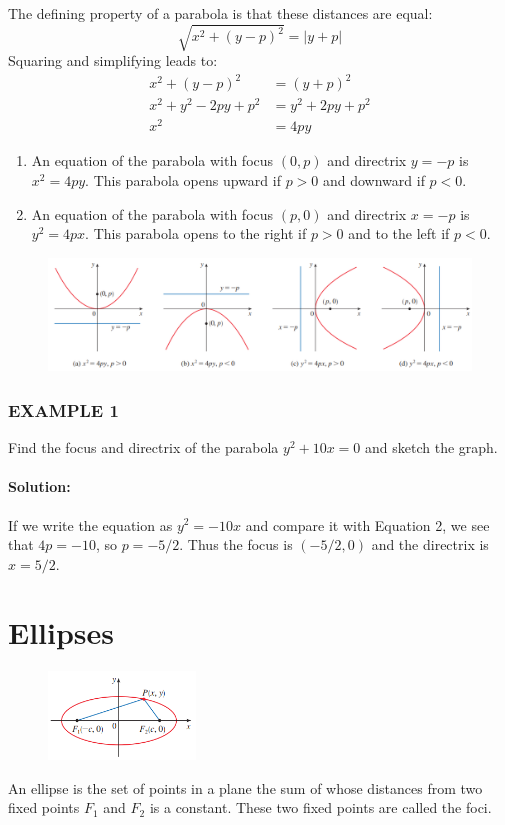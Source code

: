 \documentclass{article}
\begin{document}
The defining property of a parabola is that these distances are equal:
\[
\sqrt{x^2 + (y-p)^2} = |y+p|
\]
Squaring and simplifying leads to:
\begin{align*}
    x^2 + (y-p)^2 &= (y+p)^2 \\
    x^2 + y^2 - 2py + p^2 &= y^2 + 2py + p^2 \\
    x^2 &= 4py
\end{align*}

\begin{enumerate}
    \item An equation of the parabola with focus $(0,p)$ and directrix $y=-p$ is $x^2 = 4py$. This parabola opens upward if $p > 0$ and downward if $p < 0$.
    \item An equation of the parabola with focus $(p,0)$ and directrix $x=-p$ is $y^2 = 4px$. This parabola opens to the right if $p > 0$ and to the left if $p < 0$.
\end{enumerate}
\begin{figure}[htbp]
    \centering
    \includegraphics[width=1\textwidth]{graph53.png}
\end{figure}

\subsubsection*{EXAMPLE 1}
Find the focus and directrix of the parabola $y^2 + 10x = 0$ and sketch the graph.

\paragraph{Solution:} If we write the equation as $y^2 = -10x$ and compare it with Equation 2, we see that $4p = -10$, so $p = -5/2$. Thus the focus is $(-5/2, 0)$ and the directrix is $x = 5/2$.

\section*{Ellipses}
\begin{figure}[htbp]
    \centering
    \includegraphics[width=0.35\textwidth]{graph55.png}
\end{figure}
An ellipse is the set of points in a plane the sum of whose distances from two fixed points $F_1$ and $F_2$ is a constant. These two fixed points are called the foci.
\end{document}
